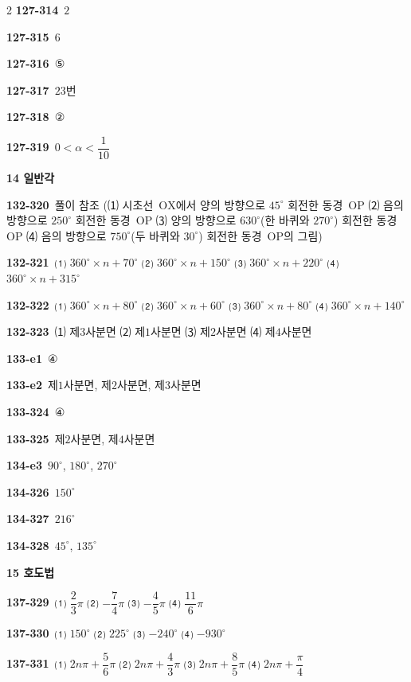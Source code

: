 \documentclass[10pt,a4paper]{article}
\newcommand{\pt}[1]{\mathrm{#1}}
\begin{document}
\begin{multicols}{2}
\noindent\textbf{127-314}\ $2$\par
\noindent\textbf{127-315}\ $6$\par
\noindent\textbf{127-316}\ ⑤\par
\noindent\textbf{127-317}\ $23$번\par
\noindent\textbf{127-318}\ ②\par
\noindent\textbf{127-319}\ $0<\alpha<\dfrac{1}{10}$\par
\noindent\textbf{14 일반각}\par\smallskip
\noindent\textbf{132-320}\ 풀이 참조 (⑴ 시초선~$\pt{OX}$에서 양의 방향으로 $45^\circ$ 회전한 동경~$\pt{OP}$ ⑵ 음의 방향으로 $250^\circ$ 회전한 동경~$\pt{OP}$ ⑶ 양의 방향으로 $630^\circ$(한 바퀴와 $270^\circ$) 회전한 동경~$\pt{OP}$ ⑷ 음의 방향으로 $750^\circ$(두 바퀴와 $30^\circ$) 회전한 동경~$\pt{OP}$의 그림)\par
\noindent\textbf{132-321}\ ⑴ $360^\circ\times n+70^\circ$ ⑵ $360^\circ\times n+150^\circ$ ⑶ $360^\circ\times n+220^\circ$ ⑷ $360^\circ\times n+315^\circ$\par
\noindent\textbf{132-322}\ ⑴ $360^\circ\times n+80^\circ$ ⑵ $360^\circ\times n+60^\circ$ ⑶ $360^\circ\times n+80^\circ$ ⑷ $360^\circ\times n+140^\circ$\par
\noindent\textbf{132-323}\ ⑴ 제$3$사분면 ⑵ 제$1$사분면 ⑶ 제$2$사분면 ⑷ 제$4$사분면\par
\noindent\textbf{133-e1}\ ④\par
\noindent\textbf{133-e2}\ 제$1$사분면, 제$2$사분면, 제$3$사분면\par
\noindent\textbf{133-324}\ ④\par
\noindent\textbf{133-325}\ 제$2$사분면, 제$4$사분면\par
\noindent\textbf{134-e3}\ $90^\circ$, $180^\circ$, $270^\circ$\par
\noindent\textbf{134-326}\ $150^\circ$\par
\noindent\textbf{134-327}\ $216^\circ$\par
\noindent\textbf{134-328}\ $45^\circ$, $135^\circ$\par
\noindent\textbf{15 호도법}\par\smallskip
\noindent\textbf{137-329}\ ⑴ $\dfrac{2}{3}\pi$ ⑵ $-\dfrac{7}{4}\pi$ ⑶ $-\dfrac{4}{5}\pi$ ⑷ $\dfrac{11}{6}\pi$\par
\noindent\textbf{137-330}\ ⑴ $150^\circ$ ⑵ $225^\circ$ ⑶ $-240^\circ$ ⑷ $-930^\circ$\par
\noindent\textbf{137-331}\ ⑴ $2n\pi+\dfrac{5}{6}\pi$ ⑵ $2n\pi+\dfrac{4}{3}\pi$ ⑶ $2n\pi+\dfrac{8}{5}\pi$ ⑷ $2n\pi+\dfrac{\pi}{4}$\par

\end{multicols}
\end{document}
